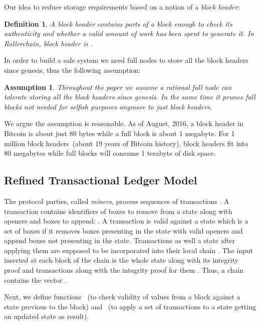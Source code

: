 \documentclass[conference,compsoc]{IEEEtran}
\newtheorem{definition}{Definition}
\newtheorem{assumption}{Assumption}
\begin{document}
Our idea to reduce storage requirements based on a notion of a \textit{block header}: 

\begin{definition}
A block header contains parts of a block enough to check its authenticity and whether a valid amount of work has been spent to generate it. In Rollerchain, block header is .
\end{definition}

In order to build a safe system we need full nodes to store all the block headers since genesis, thus the following assumption: 

\begin{assumption}
Throughout the paper we assume a rational full node can tolerate storing all the block headers since genesis. In the same time it prunes full blocks not needed for selfish purposes anymore to just block headers.
\end{assumption}

We argue the assumption is reasonable. As of August, 2016, a block header in Bitcoin is about just 80 bytes while a full block is about 1 megabyte. For 1 million block headers~(about 19 years of Bitcoin history), block headers fit into 80 megabytes while full blocks will consume 1 terabyte of disk space. 

\subsection{Refined Transactional Ledger Model}

The protocol parties, called \textit{miners}, process sequences of transactions . A transaction contains identifiers of boxes to remove from a state along with openers and boxes to append: . A transaction is valid against a state which is a set of boxes if it removes boxes presenting in the state with valid openers and append boxes not presenting in the state. Transactions as well a state after applying them are supposed to be incorporated into their local chain . The input inserted at each block of the chain  is the whole state along with its integrity proof  and transactions along with the integrity proof for them  . Thus, a chain  contains the vector .


Next, we define functions ~(to check validity of  values from a block against a state  previous to the block) and ~(to apply a set of transactions  to a state  getting an updated state as result).
\end{document}
